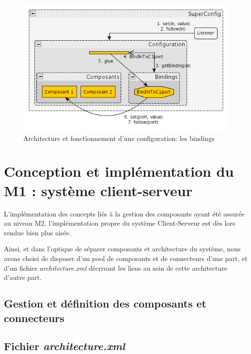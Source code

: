 \documentclass[french,a4paper,titlepage]{article}
\begin{document}
			\begin{figure}[ht]
				\centering
				\includegraphics[width=1.00\textwidth]{obsimpl2.png}
				\caption{Architecture et fonctionnement d'une configuration: les
          			  bindings}
				\label{fig:obsimpl2}
			\end{figure}
			
			
	\section{Conception et implémentation du M1 : système client-serveur}
	
	  L'implémentation des concepts liés à la gestion des composants ayant été
	  assurée au niveau M2, l'implémentation propre du système Client-Serveur est
	  dès lors rendue bien plus aisée.
	  
    Ainsi, et dans l'optique de séparer composants et architecture du système,
    nous avons choisi de disposer d'un pool de composants et de connecteurs
    d'une part, et d'un fichier \emph{architecture.xml} décrivant les liens au
    sein de cette architecture d'autre part.
    
    \subsection{Gestion et définition des composants et connecteurs}
    
      
    
    \subsection{Fichier \emph{architecture.xml}}
    
      
	
\end{document}
